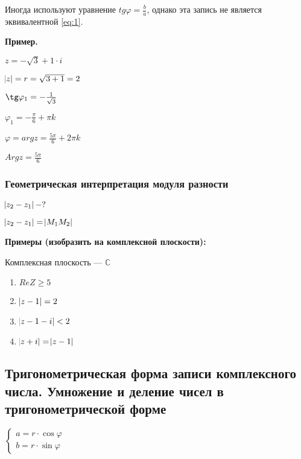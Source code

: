 \documentclass{article}
\begin{document}
    Иногда используют уравнение \(tg \varphi = \frac{b}{a}\), однако эта запись не является эквивалентной \ref{eq:1}.

    \textbf{Пример.}
    
    \( z = -\sqrt{3} + 1 \cdot i \)

    \( \abs{z} = r = \sqrt{3 + 1} = 2 \)


    \( \tg\varphi_1 = -\frac{1}{\sqrt{3}} \)    

    \( \varphi_1 = -\frac{\pi}{6} + \pi k \)

    \( \varphi = argz = \frac{5\pi}{6} + 2\pi k \)

    \( Argz = \frac{5\pi}{6} \)

    \subsubsection{Геометрическая интерпретация модуля разности}

    \( \abs{z_2 - z_1} - ? \) 


    \( \abs{z_2 - z_1} = \abs{M_1M_2} \)

    \textbf{Примеры (изобразить на комплексной плоскости):}

    Комплексная плоскость --- \(\mathbb{C}\)

    \begin{enumerate}
        \item \( ReZ \geq 5 \) %
        \item \( \abs{z - 1} = 2 \) %
        \item \( \abs{z - 1 - i} < 2 \) %
        \item \( \abs{z + i} = \abs{z - 1} \) %
    \end{enumerate}
        
    \subsection{Тригонометрическая форма записи комплексного числа. Умножение и деление чисел в тригонометрической форме}

    \( \begin{cases}
        a = r\cdot \cos\varphi\\
        b = r\cdot \sin\varphi
    \end{cases}\)
    
\end{document}
